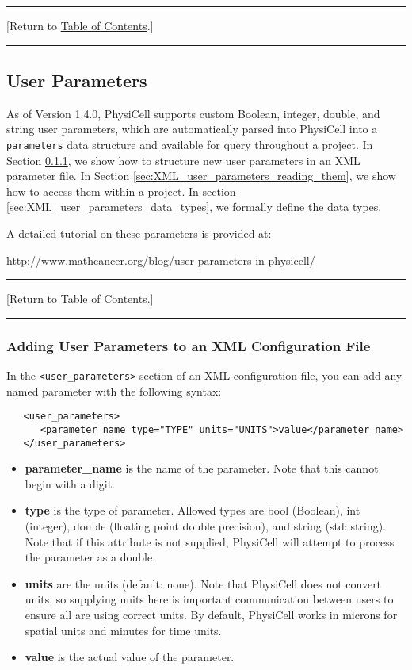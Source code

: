 \documentclass[12pt]{article}
\renewcommand{\v}{\verb}
\newcommand{\TOClink}{\begin{center}\hrule\vskip-5pt\phantom{.}\hfill[Return to \hyperlink{TOC}{Table of Contents}.]\hfill\phantom{.}\vskip3pt\hrule\end{center}}
\begin{document}
\TOClink 

\subsection{User Parameters}
\label{sec:XML_user_parameters}
As of Version 1.4.0, PhysiCell supports custom Boolean, integer, double, and string user parameters, which are automatically parsed into PhysiCell into a \v|parameters| data structure and available for query throughout a project. In Section \ref{sec:XML_user_parameters_XML_structure}, we show how to structure new 
user parameters in an XML parameter file. In Section \ref{sec:XML_user_parameters_reading_them}, 
we show how to access them within a project. In section \ref{sec:XML_user_parameters_data_types}, 
we formally define the data types. 

A detailed tutorial on these parameters is provided at: 
\begin{center}
\href{http://www.mathcancer.org/blog/user-parameters-in-physicell/}{http://www.mathcancer.org/blog/user-parameters-in-physicell/}
\end{center}

\TOClink

\subsubsection{Adding User Parameters to an XML Configuration File}
\label{sec:XML_user_parameters_XML_structure}
In the \v|<user_parameters>| section of an XML configuration file, you can 
add any named parameter with the following syntax: 
\begin{verbatim}
   <user_parameters>
      <parameter_name type="TYPE" units="UNITS">value</parameter_name>
   </user_parameters>
\end{verbatim}

\begin{itemize}
\item \textbf{parameter\_name} is the name of the parameter. Note that this cannot begin with a digit. 
\item \textbf{type} is the type of parameter. Allowed types are bool (Boolean), int (integer), double (floating point double precision), and string (std::string). Note that if this attribute is not supplied, PhysiCell will attempt to process the parameter as a double. 
\item \textbf{units} are the units (default: none). Note that PhysiCell does not convert units, so supplying units here is important communication between users to ensure all are using correct units. By default, PhysiCell works in microns for spatial units and minutes for time units. 
\item \textbf{value} is the actual value of the parameter. 
\end{itemize}
\end{document}
